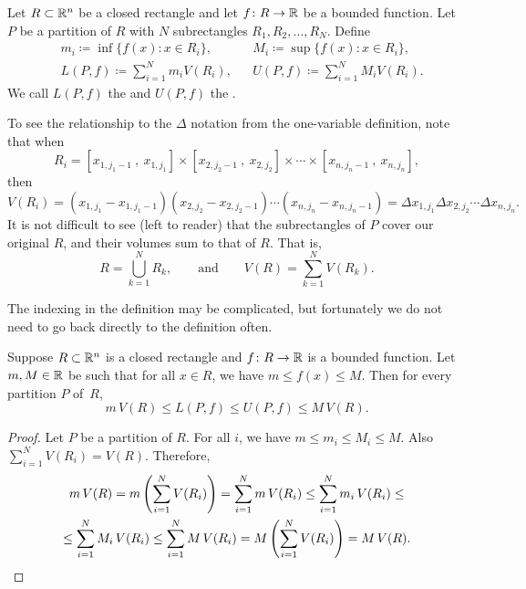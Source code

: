 \begin{defn}
Let $R \subset {\mathbb{R}}^n$ be a closed rectangle and
let $f \colon R \to {\mathbb{R}}$ be a bounded function.  Let $P$ be a partition of
$R$ with $N$ subrectangles $R_1,R_2,\ldots,R_N$.
Define
\begin{align*}
& m_i \coloneqq \inf \bigl\{ f(x) : x \in R_i \bigr\} , & 
& M_i \coloneqq \sup \bigl\{ f(x) : x \in R_i \bigr\} , \\
& L(P,f) \coloneqq
\sum_{i=1}^N m_i V(R_i) , &
& U(P,f) \coloneqq
\sum_{i=1}^N M_i V(R_i) .
\end{align*}
We call $L(P,f)$ the \emph{} and
$U(P,f)$ the \emph{}.
\end{defn}

To see the relationship to the $\Delta$ notation from the one-variable
definition, note that when
\begin{equation*}
R_i = [x_{1,j_1-1}~,~ x_{1,j_1}]
\times
[x_{2,j_2-1}~,~ x_{2,j_2}]
\times
\cdots
\times
[x_{n,j_n-1}~,~ x_{n,j_n}] ,
\end{equation*}
then
\begin{equation*}
V(R_i)
=
(x_{1,j_1}-x_{1,j_1-1})
(x_{2,j_2}-x_{2,j_2-1})
\cdots
(x_{n,j_n}-x_{n,j_n-1})
= 
\Delta x_{1,j_1}
\Delta x_{2,j_2}
\cdots
\Delta x_{n,j_n} .
\end{equation*}
It is not difficult to see (left to reader) that
the subrectangles of $P$ cover our original $R$, and their
volumes sum to that of $R$.  That is,
\begin{equation*}
R= \bigcup_{k=1}^N R_k , \qquad \text{and} \qquad
V(R) = \sum_{k=1}^N V(R_k).
\end{equation*}

The indexing in the definition may be complicated, but fortunately we
do not need to go back directly to the definition often.

\begin{prop} \label{mv:sumulbound:prop}
Suppose $R \subset {\mathbb{R}}^n$ is a closed rectangle
and $f \colon R \to {\mathbb{R}}$ is a bounded function.  Let $m, M \in {\mathbb{R}}$ be 
such that for all $x \in R$, we have $m \leq f(x) \leq M$.  Then for every partition
$P$ of~$R$,
\begin{equation*}
m \, V(R) \leq
L(P,f) \leq U(P,f)
\leq M\, V(R) .
\end{equation*}
\end{prop}

\begin{proof}
Let $P$ be a partition of $R$.  For all $i$, we have
$m \leq m_i \leq M_i \leq M$.  Also $\sum_{i=1}^N V(R_i) = V(R)$.  Therefore,
\begin{multline*}
m \, V(R) =
m \left( \sum_{i=1}^N V(R_i) \right)
=
\sum_{i=1}^N m \, V(R_i)
\leq
\sum_{i=1}^N m_i \, V(R_i)
\leq
\\
\leq
\sum_{i=1}^N M_i \, V(R_i)
\leq
\sum_{i=1}^N M \,V(R_i)
=
M \left( \sum_{i=1}^N V(R_i) \right)
=
M \,V(R) .  \qedhere
\end{multline*}
\end{proof}

